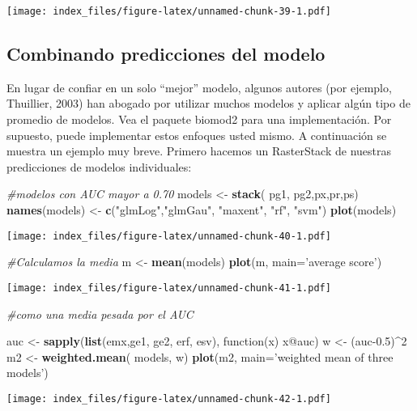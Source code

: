 \documentclass[]{article}
\newenvironment{Shaded}{\begin{snugshade}}{\end{snugshade}}
\newcommand{\KeywordTok}[1]{\textcolor[rgb]{0.13,0.29,0.53}{\textbf{{#1}}}}
\newcommand{\DataTypeTok}[1]{\textcolor[rgb]{0.13,0.29,0.53}{{#1}}}
\newcommand{\DecValTok}[1]{\textcolor[rgb]{0.00,0.00,0.81}{{#1}}}
\newcommand{\FloatTok}[1]{\textcolor[rgb]{0.00,0.00,0.81}{{#1}}}
\newcommand{\StringTok}[1]{\textcolor[rgb]{0.31,0.60,0.02}{{#1}}}
\newcommand{\CommentTok}[1]{\textcolor[rgb]{0.56,0.35,0.01}{\textit{{#1}}}}
\newcommand{\NormalTok}[1]{{#1}}
\begin{document}
\texttt{[image: index\_files/figure-latex/unnamed-chunk-39-1.pdf]}

\subsection{Combinando predicciones del
modelo}\label{combinando-predicciones-del-modelo}

En lugar de confiar en un solo ``mejor'' modelo, algunos autores (por
ejemplo, Thuillier, 2003) han abogado por utilizar muchos modelos y
aplicar algún tipo de promedio de modelos. Vea el paquete biomod2 para
una implementación. Por supuesto, puede implementar estos enfoques usted
mismo. A continuación se muestra un ejemplo muy breve. Primero hacemos
un RasterStack de nuestras predicciones de modelos individuales:

\begin{Shaded}
\begin{Highlighting}[]
\CommentTok{#modelos con AUC mayor a 0.70}
\NormalTok{models <-}\StringTok{ }\KeywordTok{stack}\NormalTok{( pg1, pg2,px,pr,ps)}
\KeywordTok{names}\NormalTok{(models) <-}\StringTok{ }\KeywordTok{c}\NormalTok{(}\StringTok{"glmLog"}\NormalTok{,}\StringTok{"glmGau"}\NormalTok{, }\StringTok{"maxent"}\NormalTok{, }\StringTok{"rf"}\NormalTok{, }\StringTok{"svm"}\NormalTok{)}
\KeywordTok{plot}\NormalTok{(models)}
\end{Highlighting}
\end{Shaded}

\texttt{[image: index\_files/figure-latex/unnamed-chunk-40-1.pdf]}

\begin{Shaded}
\begin{Highlighting}[]
\CommentTok{#Calculamos la media}
\NormalTok{m <-}\StringTok{ }\KeywordTok{mean}\NormalTok{(models)}
\KeywordTok{plot}\NormalTok{(m, }\DataTypeTok{main=}\StringTok{'average score'}\NormalTok{)}
\end{Highlighting}
\end{Shaded}

\texttt{[image: index\_files/figure-latex/unnamed-chunk-41-1.pdf]}

\begin{Shaded}
\begin{Highlighting}[]
\CommentTok{#como una media pesada por el AUC}

\NormalTok{auc <-}\StringTok{ }\KeywordTok{sapply}\NormalTok{(}\KeywordTok{list}\NormalTok{(emx,ge1, ge2, erf, esv), function(x) x@auc)}
\NormalTok{w <-}\StringTok{ }\NormalTok{(auc}\FloatTok{-0.5}\NormalTok{)^}\DecValTok{2}
\NormalTok{m2 <-}\StringTok{ }\KeywordTok{weighted.mean}\NormalTok{( models, w)}
\KeywordTok{plot}\NormalTok{(m2, }\DataTypeTok{main=}\StringTok{'weighted mean of three models'}\NormalTok{)}
\end{Highlighting}
\end{Shaded}

\texttt{[image: index\_files/figure-latex/unnamed-chunk-42-1.pdf]}
\end{document}
